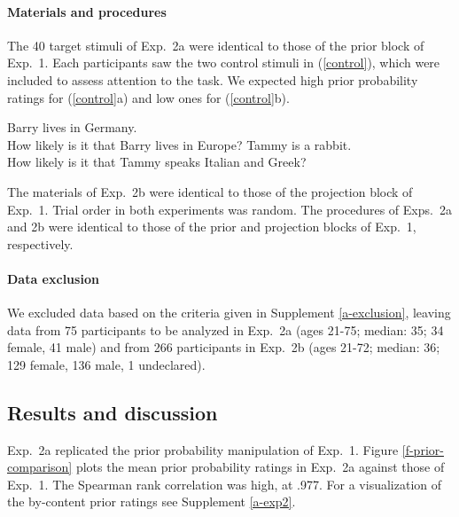 \documentclass[11pt,fleqn]{article}
\newcommand{\6}{\mbox{$[\hspace*{-.6mm}[$}}
\newcommand{\9}{\mbox{$]\hspace*{-.6mm}]$}}
\begin{document}
\paragraph{Materials and procedures} The 40 target stimuli of Exp.~2a were identical to those of the prior block of Exp.~1. Each participants saw the two control stimuli in (\ref{control}), which were included to assess attention to the task. We expected high prior probability ratings for (\ref{control}a) and low ones for (\ref{control}b). 

\begin{exe}
\ex\label{control2}
\begin{xlist}
 Barry lives in Germany. \\ How likely is it that Barry lives in Europe?
 Tammy is a rabbit. \\ How likely is it that Tammy speaks Italian and Greek?
\end{xlist}
\end{exe}
The materials of Exp.~2b were identical to those of the projection block of Exp.~1. Trial order in both experiments was random. The procedures of Exps.~2a and 2b were identical to those of the prior and projection blocks of Exp.~1, respectively.

\paragraph{Data exclusion} We excluded data based on the criteria given in Supplement \ref{a-exclusion}, leaving data from 75 participants to be analyzed in Exp.~2a (ages 21-75; median: 35; 34 female, 41 male) and from 266 participants in Exp.~2b (ages 21-72; median: 36; 129 female, 136 male, 1 undeclared).

\subsection{Results and discussion}

Exp.~2a replicated the prior probability manipulation of Exp.~1. Figure \ref{f-prior-comparison} plots the mean prior probability ratings in Exp.~2a against those of Exp.~1. The Spearman rank correlation was high, at .977. For a visualization of the by-content prior ratings see Supplement \ref{a-exp2}.
\end{document}
